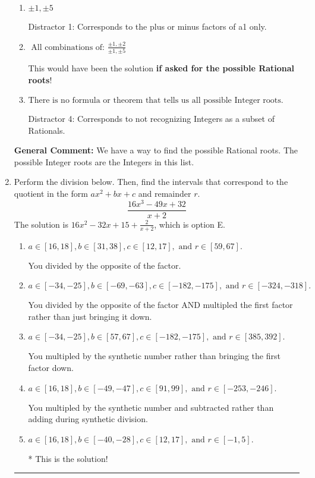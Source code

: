 \documentclass{extbook}[14pt]
\newcommand{\litem}[1]{\item #1

\rule{\textwidth}{0.4pt}}
\begin{document}
\begin{enumerate}
{\begin{enumerate}[label=\Alph*.]
* This is the solution \textbf{since we asked for the possible Integer roots}!
\item \( \pm 1,\pm 5 \)

 Distractor 1: Corresponds to the plus or minus factors of a1 only.
\item \( \text{ All combinations of: }\frac{\pm 1,\pm 2}{\pm 1,\pm 5} \)

This would have been the solution \textbf{if asked for the possible Rational roots}!
\item \( \text{There is no formula or theorem that tells us all possible Integer roots.} \)

 Distractor 4: Corresponds to not recognizing Integers as a subset of Rationals.
\end{enumerate}

\textbf{General Comment:} We have a way to find the possible Rational roots. The possible Integer roots are the Integers in this list.
}
\litem{
Perform the division below. Then, find the intervals that correspond to the quotient in the form $ax^2+bx+c$ and remainder $r$.
\[ \frac{16x^{3} -49 x + 32}{x + 2} \]The solution is \( 16x^{2} -32 x + 15 + \frac{2}{x + 2} \), which is option E.\begin{enumerate}[label=\Alph*.]
\item \( a \in [16, 18], b \in [31, 38], c \in [12, 17], \text{ and } r \in [59, 67]. \)

 You divided by the opposite of the factor.
\item \( a \in [-34, -25], b \in [-69, -63], c \in [-182, -175], \text{ and } r \in [-324, -318]. \)

 You divided by the opposite of the factor AND multipled the first factor rather than just bringing it down.
\item \( a \in [-34, -25], b \in [57, 67], c \in [-182, -175], \text{ and } r \in [385, 392]. \)

 You multipled by the synthetic number rather than bringing the first factor down.
\item \( a \in [16, 18], b \in [-49, -47], c \in [91, 99], \text{ and } r \in [-253, -246]. \)

 You multipled by the synthetic number and subtracted rather than adding during synthetic division.
\item \( a \in [16, 18], b \in [-40, -28], c \in [12, 17], \text{ and } r \in [-1, 5]. \)

* This is the solution!
\end{enumerate}

}
\end{enumerate}
\end{document}
